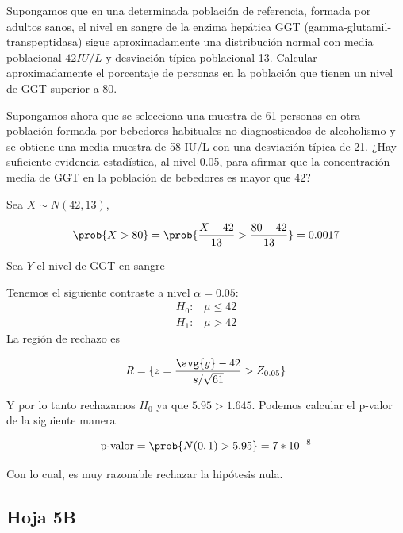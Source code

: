 \begin{problem}[8] 

\ppart Supongamos que en una determinada población de referencia, formada por adultos sanos, el nivel en sangre de la enzima hepática GGT (gamma-glutamil-transpeptidasa) sigue aproximadamente una distribución normal con media poblacional $42 IU/L$ y desviación típica poblacional 13. Calcular aproximadamente el porcentaje de personas en la población que tienen un nivel de GGT superior a 80.

\ppart Supongamos ahora que se selecciona una muestra de 61 personas en otra población formada por bebedores habituales no diagnosticados de alcoholismo y se obtiene una media muestra de 58 IU/L con una desviación típica de 21. ¿Hay suficiente evidencia estadística, al nivel 0.05, para afirmar que la concentración media de GGT en la población de bebedores es mayor que 42?

\solution

\spart
Sea $X \sim N(42, 13)$,

\[
\prob{X > 80} =
\prob{\frac{X-42}{13} > \frac{80 -42}{13}} =
0.0017
\]

\spart
Sea $Y$ el nivel de GGT en sangre

Tenemos el siguiente contraste a nivel $\alpha = 0.05$:
\begin{gather*}
H_0 : \;\;\; \mu \leq 42\\
H_1 : \;\;\; \mu > 42
\end{gather*}
La región de rechazo es

\[ R = \{ z = \frac{\avg{y} - 42}{s/\sqrt{61}} > Z_{0.05} \} \]

Y por lo tanto rechazamos $H_0$ ya que $5.95 > 1.645$. Podemos calcular el p-valor de la siguiente manera

\[
\text{p-valor} =
\prob{N(0, 1) > 5.95} = 7*10^{-8}
\]

Con lo cual, es muy razonable rechazar la hipótesis nula.

\end{problem}

\newpage
\subsection{Hoja 5B}


